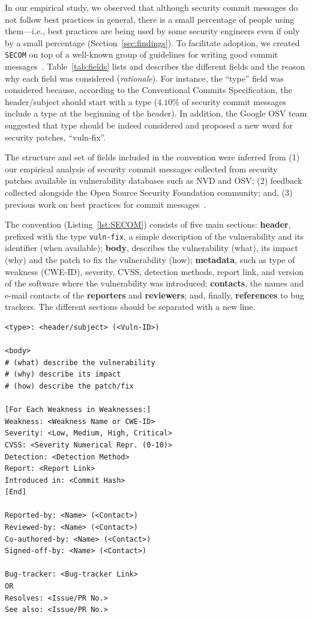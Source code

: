 In our empirical study, we observed that although security commit messages do not follow best practices in general, there is a small percentage of people using them---i.e., best practices are being used by some security engineers even if only by a small percentage (Section~\ref{sec:findings}). To facilitate adoption, we created \texttt{SECOM} on top of a well-known group of 
guidelines
for writing good commit messages~\cite{convcom, atomic, linus, goodcommit}.  
Table~\ref{tab:fields} lists and describes the different fields and the reason why each field was considered (\textit{rationale}). For instance, the ``type'' field 
was considered because, according to the Conventional Commits Specification, the header/subject should start with a type ($4.10\%$ of security commit messages include a type at the beginning of the header). In addition, the Google OSV team suggested that type should be indeed considered and proposed a new word for security patches, ``vuln-fix''.

The structure and set of fields 
included in the convention were inferred 
from (1) our empirical analysis  of security
commit messages collected from security patches available in vulnerability
databases such as NVD and OSV; 
(2) feedback collected alongside
the Open Source Security Foundation community; and, (3) previous work on best practices for commit messages~\cite{convcom, atomic, linus, goodcommit,Tian_2022}.

The convention (Listing~\ref{lst:SECOM}) consists of five main 
sections: \textbf{header}, prefixed with the type \texttt{vuln-fix}, 
a simple description of the vulnerability and its identifier 
(when available); \textbf{body}, describes the vulnerability 
(what), its impact (why) and the patch to fix the vulnerability 
(how); \textbf{metadata}, such as type of weakness (CWE-ID), 
severity, CVSS, detection methods, report link, and version 
of the software where the vulnerability was introduced; 
\textbf{contacts}, the names and e-mail contacts of 
the \textbf{reporters} and \textbf{reviewers}; and, finally,
\textbf{references} to bug trackers. The different
sections should be separated with a new line.

\begin{lstlisting}[caption={SECOM Convention},label={lst:SECOM},frame=tlrb]
<type>: <header/subject> (<Vuln-ID>)

<body>
# (what) describe the vulnerability
# (why) describe its impact
# (how) describe the patch/fix

[For Each Weakness in Weaknesses:]
Weakness: <Weakness Name or CWE-ID>
Severity: <Low, Medium, High, Critical>
CVSS: <Severity Numerical Repr. (0-10)>
Detection: <Detection Method>
Report: <Report Link>
Introduced in: <Commit Hash>
[End]

Reported-by: <Name> (<Contact>)
Reviewed-by: <Name> (<Contact>)
Co-authored-by: <Name> (<Contact>)
Signed-off-by: <Name> (<Contact>)

Bug-tracker: <Bug-tracker Link>
OR
Resolves: <Issue/PR No.>
See also: <Issue/PR No.>
\end{lstlisting}

